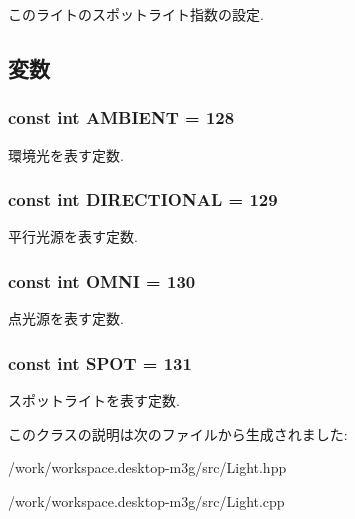 このライトのスポットライト指数の設定. 

\subsection{変数}
\hypertarget{classm3g_1_1Light_4cf648a82d9de62a1fb15f4277049594}{
\subsubsection[{AMBIENT}]{\setlength{\rightskip}{0pt plus 5cm}const int {\bf AMBIENT} = 128}}
\label{classm3g_1_1Light_4cf648a82d9de62a1fb15f4277049594}


環境光を表す定数. \hypertarget{classm3g_1_1Light_a2fb668ca8bbeb8323eda98fba594fda}{
\subsubsection[{DIRECTIONAL}]{\setlength{\rightskip}{0pt plus 5cm}const int {\bf DIRECTIONAL} = 129}}
\label{classm3g_1_1Light_a2fb668ca8bbeb8323eda98fba594fda}


平行光源を表す定数. \hypertarget{classm3g_1_1Light_34d360bb8395ad7fbcd3ec286ece64cb}{
\subsubsection[{OMNI}]{\setlength{\rightskip}{0pt plus 5cm}const int {\bf OMNI} = 130}}
\label{classm3g_1_1Light_34d360bb8395ad7fbcd3ec286ece64cb}


点光源を表す定数. \hypertarget{classm3g_1_1Light_c44aef16b96dc8fd8b134416964a7de9}{
\subsubsection[{SPOT}]{\setlength{\rightskip}{0pt plus 5cm}const int {\bf SPOT} = 131}}
\label{classm3g_1_1Light_c44aef16b96dc8fd8b134416964a7de9}


スポットライトを表す定数. 

このクラスの説明は次のファイルから生成されました:\begin{CompactItemize}
\item 
/work/workspace.desktop-m3g/src/Light.hpp\item 
/work/workspace.desktop-m3g/src/Light.cpp\end{CompactItemize}
